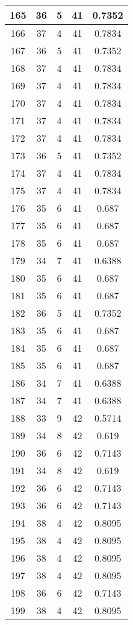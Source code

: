 \documentclass[letterpaper, 12pt]{article}
\begin{document}
\begin{longtable}{|c|c|c|c|c|}
\hline
165 & 36 & 5 & 41 & 0.7352 \\
\hline
166 & 37 & 4 & 41 & 0.7834 \\
\hline
167 & 36 & 5 & 41 & 0.7352 \\
\hline
168 & 37 & 4 & 41 & 0.7834 \\
\hline
169 & 37 & 4 & 41 & 0.7834 \\
\hline
170 & 37 & 4 & 41 & 0.7834 \\
\hline
171 & 37 & 4 & 41 & 0.7834 \\
\hline
172 & 37 & 4 & 41 & 0.7834 \\
\hline
173 & 36 & 5 & 41 & 0.7352 \\
\hline
174 & 37 & 4 & 41 & 0.7834 \\
\hline
175 & 37 & 4 & 41 & 0.7834 \\
\hline
176 & 35 & 6 & 41 & 0.687 \\
\hline
177 & 35 & 6 & 41 & 0.687 \\
\hline
178 & 35 & 6 & 41 & 0.687 \\
\hline
179 & 34 & 7 & 41 & 0.6388 \\
\hline
180 & 35 & 6 & 41 & 0.687 \\
\hline
181 & 35 & 6 & 41 & 0.687 \\
\hline
182 & 36 & 5 & 41 & 0.7352 \\
\hline
183 & 35 & 6 & 41 & 0.687 \\
\hline
184 & 35 & 6 & 41 & 0.687 \\
\hline
185 & 35 & 6 & 41 & 0.687 \\
\hline
186 & 34 & 7 & 41 & 0.6388 \\
\hline
187 & 34 & 7 & 41 & 0.6388 \\
\hline
188 & 33 & 9 & 42 & 0.5714 \\
\hline
189 & 34 & 8 & 42 & 0.619 \\
\hline
190 & 36 & 6 & 42 & 0.7143 \\
\hline
191 & 34 & 8 & 42 & 0.619 \\
\hline
192 & 36 & 6 & 42 & 0.7143 \\
\hline
193 & 36 & 6 & 42 & 0.7143 \\
\hline
194 & 38 & 4 & 42 & 0.8095 \\
\hline
195 & 38 & 4 & 42 & 0.8095 \\
\hline
196 & 38 & 4 & 42 & 0.8095 \\
\hline
197 & 38 & 4 & 42 & 0.8095 \\
\hline
198 & 36 & 6 & 42 & 0.7143 \\
\hline
199 & 38 & 4 & 42 & 0.8095 \\
\hline
\end{longtable}
\end{document}
